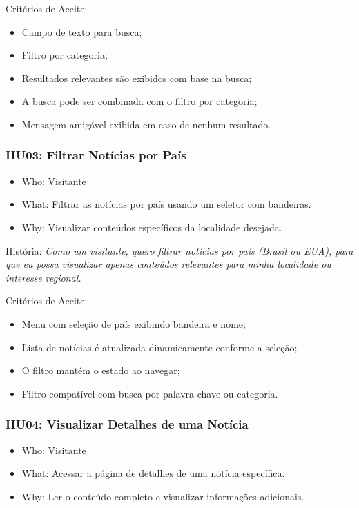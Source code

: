 \noindent Critérios de Aceite:
\begin{itemize}
  \item Campo de texto para busca;
  \item Filtro por categoria;
  \item Resultados relevantes são exibidos com base na busca;
  \item A busca pode ser combinada com o filtro por categoria;
  \item Mensagem amigável exibida em caso de nenhum resultado.
\end{itemize}

\subsubsection*{HU03: Filtrar Notícias por País}

\begin{itemize}
  \item Who: Visitante
  \item What: Filtrar as notícias por país usando um seletor com bandeiras.
  \item Why: Visualizar conteúdos específicos da localidade desejada.
\end{itemize}

\noindent História: \textit{Como um visitante, quero filtrar notícias por país (Brasil ou EUA), para que eu possa visualizar apenas conteúdos relevantes para minha localidade ou interesse regional.}

\noindent Critérios de Aceite:
\begin{itemize}
  \item Menu com seleção de país exibindo bandeira e nome;
  \item Lista de notícias é atualizada dinamicamente conforme a seleção;
  \item O filtro mantém o estado ao navegar;
  \item Filtro compatível com busca por palavra-chave ou categoria.
\end{itemize}

\subsubsection*{HU04: Visualizar Detalhes de uma Notícia}

\begin{itemize}
  \item Who: Visitante
  \item What: Acessar a página de detalhes de uma notícia específica.
  \item Why: Ler o conteúdo completo e visualizar informações adicionais.
\end{itemize}

